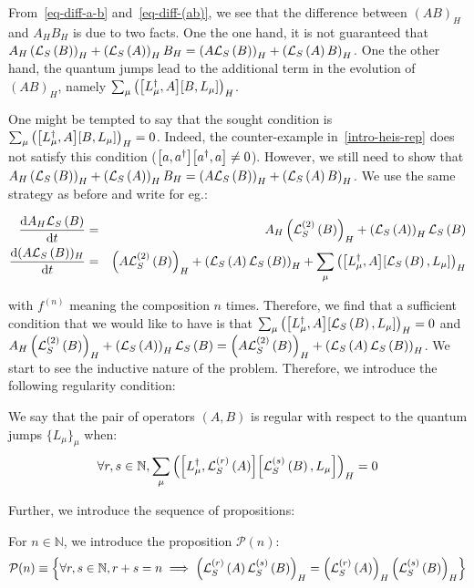 From~\autoref{eq-diff-a-b} and~\autoref{eq-diff-(ab)}, we see that the difference between $(A B)_H$ and $A_H B_H$ is due to two facts. One the one hand, it is not guaranteed that $A_H \left(\mathcal{L}_S\left(B\right)\right)_H + \left(\mathcal{L}_S\left(A\right)\right)_H B_H = \left(A \mathcal{L}_S\left(B\right)\right)_H + \left(\mathcal{L}_S\left(A\right) B\right)_H$. One the other hand, the quantum jumps lead to the additional term in the evolution of $(A B)_H$, namely $\sum_\mu \heis{\commutator{L^\dagger_\mu}{A} \commutator{B}{L_\mu}}$.

One might be tempted to say that the sought condition is $\sum_\mu \heis{\commutator{L^\dagger_\mu}{A} \commutator{B}{L_\mu}} = 0$. Indeed, the counter-example in~\autoref{intro-heis-rep} does not satisfy this condition ($\commutator{a}{a^\dagger} \commutator{a^\dagger}{a} \neq 0$). However, we still need to show that $A_H \left(\mathcal{L}_S\left(B\right)\right)_H + \left(\mathcal{L}_S\left(A\right)\right)_H B_H = \left(A \mathcal{L}_S\left(B\right)\right)_H + \left(\mathcal{L}_S\left(A\right) B\right)_H$. We use the same strategy as before and write for eg.:

\begin{eqnarray}
    \timeDeriv{A_H \LS{B}} &=& A_H \heis{\LSS{2}{B}} + \heis{\LS{A}} \LS{B}\\
    \timeDeriv{(A \LS{B})_H} &=& \heis{A \LSS{2}{B}} + \heis{\LS{A} \LS{B}} + \sum_\mu \heis{\commutator{L^\dagger_\mu}{A} \commutator{\LS{B}}{L_\mu}}
\end{eqnarray}

with $f^{(n)}$ meaning the composition $n$ times. Therefore, we find that a sufficient condition that we would like to have is that $\sum_\mu \heis{\commutator{L^\dagger_\mu}{A} \commutator{\LS{B}}{L_\mu}} = 0$ and $A_H \left(\mathcal{L}^{(2)}_S\left(B\right)\right)_H + \left(\mathcal{L}_S\left(A\right)\right)_H \mathcal{L}_S\left(B\right) = \left(A \mathcal{L}^{(2)}_S\left(B\right)\right)_H + \left(\mathcal{L}_S\left(A\right) \mathcal{L}_S\left(B\right)\right)_H$. We start to see the inductive nature of the problem. Therefore, we introduce the following regularity condition:

\begin{definition}
    We say that the pair of operators $(A, B)$ is regular with respect to the quantum jumps $\{L_\mu\}_\mu$ when:
    \begin{equation}
        \forall r, s \in \mathbb{N}, \sum_\mu \heis{\commutator{L^\dagger_\mu}{\LSS{r}{A}} \commutator{\LSS{s}{B}}{L_\mu}} = 0
    \end{equation}
\end{definition}

Further, we introduce the sequence of propositions:

\begin{definition}
    For $n \in \mathbb{N}$, we introduce the proposition $\mathcal{P}(n)$:
    \begin{equation}
        \mathcal{P}(n) \equiv \left\{\forall r, s \in \mathbb{N}, r+s=n \implies \left(\mathcal{L}^{(r)}_S\left(A\right) \mathcal{L}^{(s)}_S\left(B\right)\right)_H = \left(\mathcal{L}^{(r)}_S\left(A\right)\right)_H \left(\mathcal{L}^{(s)}_S\left(B\right)\right)_H\right\}
    \end{equation}
\end{definition}

